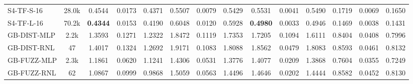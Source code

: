 \begin{table*}[h]
{\begin{tabular}{l c >{\columncolor{gray!20}}ccc >{\columncolor{gray!20}}ccc >{\columncolor{gray!20}}ccc >{\columncolor{gray!20}}ccc}
            \hline
            S4-TF-S-16 & 28.0k & 0.4544 & 0.0173 & 0.4371 & 0.5507 & 0.0079 & 0.5429 & 0.5531 & 0.0041 & 0.5490 & 0.1719 & 0.0069 & 0.1650 \\
            S4-TF-L-16 & 70.2k & \textbf{0.4344} & 0.0153 & 0.4190 & 0.6048 & 0.0120 & 0.5928 & \textbf{0.4980} & 0.0033 & 0.4946 & 0.1469 & 0.0038 & 0.1431 \\
            \hline
            GB-DIST-MLP & 2.2k & 1.3593 & 0.1271 & 1.2322 & 1.8472 & 0.1119 & 1.7353 & 1.7205 & 0.1094 & 1.6111 & 0.8404 & 0.0408 & 0.7996 \\
            GB-DIST-RNL & 47 & 1.4017 & 0.1324 & 1.2692 & 1.9171 & 0.1083 & 1.8088 & 1.8562 & 0.0479 & 1.8083 & 0.8593 & 0.0461 & 0.8132 \\
            \hline
            GB-FUZZ-MLP & 2.3k & 1.1861 & 0.0620 & 1.1241 & 1.4306 & 0.0531 & 1.3776 & 1.4077 & 0.0209 & 1.3868 & 0.7604 & 0.0355 & 0.7249 \\
            GB-FUZZ-RNL & 62 & 1.0867 & 0.0999 & 0.9868 & 1.5059 & 0.0563 & 1.4496 & 1.4646 & 0.0202 & 1.4444 & 0.8582 & 0.0452 & 0.8130 \\
            \hline
            \hline
        \end{tabular}
    }
\end{table*}


